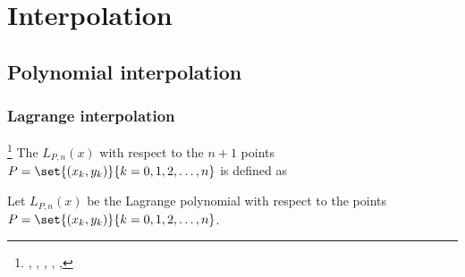 ﻿%
\chapter{Interpolation}
\section{Polynomial interpolation}
\subsection{Lagrange interpolation}
\begin{definition}
\footnote{
  ,
  ,
  ,
  ,
  ,
  }
\label{def:Ln(x)}
\label{def:lagpoly}
\label{def:laginterp}
The  $L_{P,n}(x)$ with respect to the $n+1$ points \\
$P=\set{(x_k,y_k)}{k=0,1,2,\ldots,n}$ is defined as
\end{definition}

\begin{proposition}
Let $L_{P,n}(x)$ be the Lagrange polynomial with respect to the points\\
$P=\set{(x_k,y_k)}{k=0,1,2,\ldots,n}$.
\end{proposition}

